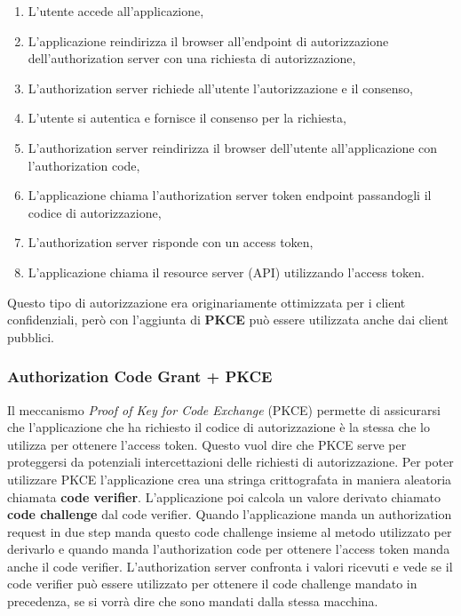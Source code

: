 \begin{enumerate}
    \item L'utente accede all'applicazione,
    \item L'applicazione reindirizza il browser all'endpoint di autorizzazione
          dell'authorization server con una richiesta di autorizzazione,
    \item L'authorization server richiede all'utente l'autorizzazione e il consenso,
    \item L'utente si autentica e fornisce il consenso per la richiesta,
    \item L'authorization server reindirizza il browser dell'utente all'applicazione
          con l'authorization code,
    \item L'applicazione chiama l'authorization server token endpoint passandogli
          il codice di autorizzazione,
    \item L'authorization server risponde con un access token,
    \item L'applicazione chiama il resource server (API) utilizzando l'access token.
\end{enumerate}

Questo tipo di autorizzazione era originariamente ottimizzata per i
client confidenziali, però con l'aggiunta di \textbf{PKCE} può essere utilizzata anche dai
client pubblici.

\subsubsection{Authorization Code Grant + PKCE}

Il meccanismo \textit{Proof of Key for Code Exchange} (PKCE) permette di assicurarsi
che l'applicazione che ha richiesto il codice di autorizzazione è la stessa che lo
utilizza per ottenere l'access token. Questo vuol dire che PKCE serve per proteggersi
da potenziali intercettazioni delle richiesti di autorizzazione.
Per poter utilizzare PKCE l'applicazione crea una stringa crittografata in maniera
aleatoria chiamata \textbf{code verifier}. L'applicazione poi calcola un valore derivato
chiamato \textbf{code challenge} dal code verifier. Quando l'applicazione manda un
authorization request in due step manda questo code challenge insieme al metodo utilizzato
per derivarlo e quando manda l'authorization code per ottenere l'access token manda anche
il code verifier. L'authorization server confronta i valori ricevuti e vede se
il code verifier può essere utilizzato per ottenere il code challenge mandato in precedenza,
se si vorrà dire che sono mandati dalla stessa macchina.\\

